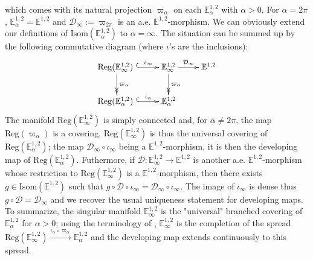 \documentclass[a4paper,12pt]{article}
\def\D{\mathcal{D}}
\def\isom{Isom}
\def\D{\mathcal{D}}
\newcommand{\mass}[1]{{\mathbb E}^{1,2}_{#1}}
\def\isom{\mathrm{Isom}}
\def\Reg{\mathrm{Reg}}
\def\reg{\Reg}
\begin{document}
which comes with its natural projection $\varpi_\alpha$ on each $\mass{\alpha}$ with $\alpha>0$. 
For $\alpha=2\pi$, $\mass{\alpha}=\mass{}$ and $\D_\infty:=\varpi_{2\pi}$ is an a.e. $\mass{}$-morphism. 
We can obviously extend our definitions of $\isom(\mass{\alpha})$ to $\alpha = \infty$.
The situation can be summed up by the following commutative diagram (where $\iota$'s are the inclusions):
$$\xymatrix{
\reg(\mass{\infty})~\ar@{^{(}->}[r]^{~~~~\iota_\infty}\ar@{->>}[d]^{\varpi_\alpha}&\mass{\infty} \ar[r]^{\D_\infty}\ar@{->>}[d]^{\varpi_\alpha}& \mass{} \\ 
\reg(\mass{\alpha})~\ar@{^{(}->}[r]^{~~~~\iota_\alpha} & \mass{\alpha} 
}
$$
The manifold $\reg(\mass{\infty})$ is simply connected and, for $\alpha\neq 2\pi$, the map $\reg(\varpi_\alpha)$ is a covering, $\reg(\mass{\infty})$ is thus the universal covering of $\reg(\mass{\alpha})$;
the map $\D_\infty \circ \iota_\infty$ being a $\mass{}$-morphism, it is then the developing map of $\reg(\mass{\alpha})$. Futhermore, if $\D:\mass{\infty}\rightarrow \mass{}$ is another a.e. $\mass{}$-morphism  whose restriction to $\reg(\mass{\infty})$ is a $\mass{}$-morphism,  then there exists $g\in \isom(\mass{})$ such that $g \circ\D\circ \iota_\infty =  \D_\infty\circ \iota_\infty$. The image of $\iota_\infty$ is dense thus $g\circ \D = \D_\infty$ and we recover the usual uniqueness statement for developing maps.  
To summarize, the singular manifold $\mass{\infty}$ is the "universal" branched covering of $\mass{\alpha}$ for $\alpha>0$; using  the terminology of \cite{MR0123298}, $\mass{\infty}$ is the completion of the spread $\reg(\mass{\infty})\xrightarrow{\iota_\alpha\circ \varpi_\alpha}\mass{\alpha}$ and the developing map extends continuously to this spread. 
\end{document}
